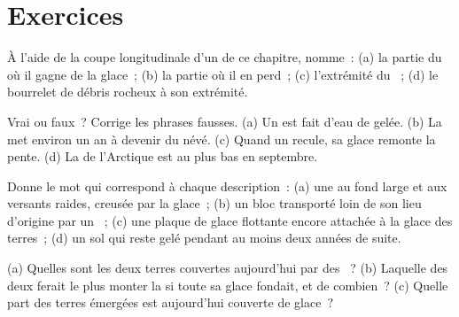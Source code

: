 \section{Exercices}

\begin{exercise}[$\star$]\label{exo:g8:ice-on-earth:1}
À l'aide de la coupe longitudinale d'un  de ce chapitre, nomme~:
(a) la partie du  où il gagne de la glace~; (b) la partie où il en
perd~; (c) l'extrémité du ~; (d) le bourrelet de débris rocheux à
son extrémité.
\end{exercise}

\begin{exercise}[$\star$]\label{exo:g8:ice-on-earth:2}
Vrai ou faux~? Corrige les phrases fausses. (a) Un  est fait d'eau
de  gelée. (b) La  met environ un an à devenir du névé. (c) Quand
un  recule, sa glace remonte la pente. (d) La  de
l'Arctique est au plus bas en septembre.
\end{exercise}

\begin{exercise}[$\star$]\label{exo:g8:ice-on-earth:3}
Donne le mot qui correspond à chaque description~: (a) une  au fond
large et aux versants raides, creusée par la glace~; (b) un bloc
transporté loin de son lieu d'origine par un ~; (c) une plaque de
glace flottante encore attachée à la glace des terres~; (d) un sol qui
reste gelé pendant au moins deux années de suite.
\end{exercise}

\begin{exercise}[$\star$]\label{exo:g8:ice-on-earth:4}
(a) Quelles sont les deux terres couvertes aujourd'hui par des ~? (b) Laquelle des deux ferait le plus monter la  si toute
sa glace fondait, et de combien~? (c) Quelle part des terres émergées est
aujourd'hui couverte de glace~?
\end{exercise}

